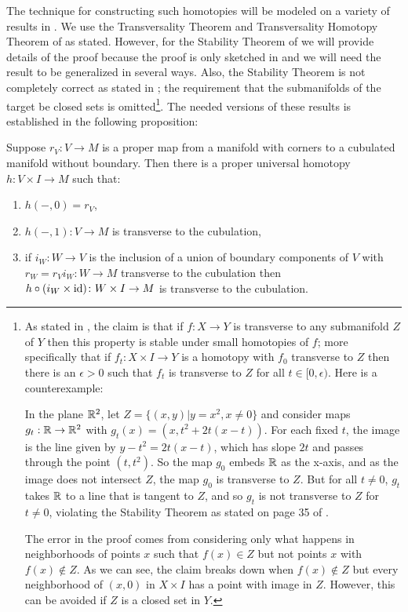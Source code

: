 The technique for constructing such homotopies will be modeled on a variety of results in \cite{GuPo74}.
We use the Transversality Theorem and Transversality Homotopy Theorem of \cite[Section 2.3]{GuPo74} as stated.
However, for the Stability Theorem of \cite[Section 1.6]{GuPo74} we will provide details of the proof because the proof is only sketched in \cite{GuPo74} and we will need the result to be generalized in several ways.
Also, the Stability Theorem is not completely correct as stated in \cite[Section 1.6]{GuPo74}; the requirement that the submanifolds of the target be closed sets is omitted\footnote{As stated in \cite{GuPo74}, the claim is that if $f \colon X \to Y$ is transverse to any submanifold $Z$ of $Y$ then this property is stable under small homotopies of $f$; more specifically that if $f_t:X \times I \to Y$ is a homotopy with $f_0$ transverse to $Z$ then there is an $\epsilon>0$ such that $f_t$ is transverse to $Z$ for all $t\in[0,\epsilon)$.
Here is a counterexample:

In the plane $\mathbb{R}^2$, let $Z = \{(x,y)|y = x^2, x\neq 0\}$ and consider maps $g_t: \mathbb{R} \to \mathbb{R}^2$ with
$g_t(x) = (x,t^2+2t(x-t))$.
For each fixed $t$, the image is the line given by $y-t^2 = 2t(x-t)$, which has slope $2t$ and passes through the point $(t,t^2)$.
So the map $g_0$ embeds $\mathbb{R}$ as the x-axis, and as the image does not intersect $Z$, the map $g_0$ is transverse to $Z$.
But for all $t\neq 0$, $g_t$ takes $\mathbb{R}$ to a line that is tangent to $Z$, and so $g_t$ is not transverse to $Z$ for $t\neq 0$, violating the Stability Theorem as stated on page 35 of \cite{GuPo74}.

The error in the proof comes from considering only what happens in neighborhoods of points $x$ such that $f(x) \in Z$ but not points $x$ with $f(x)\notin Z$.
As we can see, the claim breaks down when $f(x)\notin Z$ but every neighborhood of $(x,0)$ in $X \times I$ has a point with image in $Z$.
However, this can be avoided if $Z$ is a closed set in $Y$.}.
The needed versions of these results is established in the following proposition:

\begin{proposition}\label{P: ball stability}
	Suppose $r_V \colon V \to M$ is a proper map from a manifold with corners to a cubulated manifold without boundary.
	Then there is a proper universal homotopy $h \colon V \times I \to M$ such that:
	\begin{enumerate}
		\item $h(-,0) = r_V$,
		\item $h(-,1) \colon V \to M$ is transverse to the cubulation,
		\item if $i_W \colon W \to V$ is the inclusion of a union of boundary components of $V$ with $r_W = r_Vi_W \colon W \to M$ transverse to the cubulation then $h \circ (i_{W} \times \mathrm{id}) \colon W \times I \to M$ is transverse to the cubulation.
	\end{enumerate}
\end{proposition}

